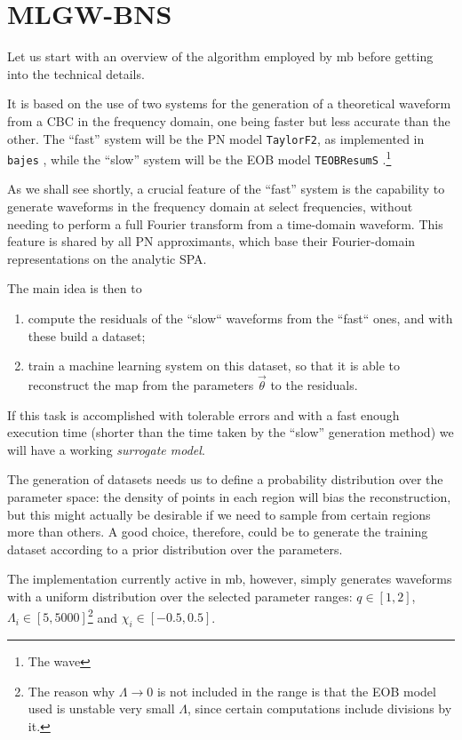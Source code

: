 \documentclass[main.tex]{subfiles}
\begin{document}
\section{MLGW-BNS}

Let us start with an overview of the algorithm employed by \ac{mb} before getting into the technical details. 

It is based on the use of two systems for the generation of a theoretical waveform from a \ac{CBC} in the frequency domain, one being faster but less accurate than the other.
The ``fast'' system will be the \ac{PN} model \texttt{TaylorF2}, as implemented in \texttt{bajes} \cite[]{breschiTtBajesBayesian2021}, while the ``slow'' system will be the \ac{EOB} model \texttt{TEOBResumS} .\footnote{The wave}

As we shall see shortly, a crucial feature of the ``fast'' system is the capability to generate waveforms in the frequency domain at select frequencies, without needing to perform a full Fourier transform from a time-domain waveform.
This feature is shared by all \ac{PN} approximants, which base their Fourier-domain representations on the analytic \ac{SPA}.

The main idea is then to 
\begin{enumerate}
    \item compute the residuals of the ``slow`` waveforms from the ``fast`` ones, and with these build a dataset;
    \item train a machine learning system on this dataset, so that it is able to reconstruct the map from the parameters \(\vec{\theta}\) to the residuals.
\end{enumerate}

If this task is accomplished with tolerable errors and with a fast enough execution time (shorter than the time taken by the ``slow'' generation method) we will have a working \emph{surrogate model}. 

The generation of datasets needs us to define a probability distribution over the parameter space: the density of points in each region will bias the reconstruction, but this might actually be desirable if we need to sample from certain regions more than others. 
A good choice, therefore, could be to generate the training dataset according to a prior distribution over the parameters. 

The implementation currently active in \ac{mb}, however, simply generates waveforms with a uniform distribution over the selected parameter ranges: \(q \in [1, 2]\), \(\Lambda _i \in [5, 5000]\)\footnote{The reason why \(\Lambda \to 0\) is not included in the range is that the \ac{EOB} model used is unstable very small \(\Lambda \), since certain computations include divisions by it.} and \(\chi_i \in [-0.5, 0.5]\).
\end{document}
